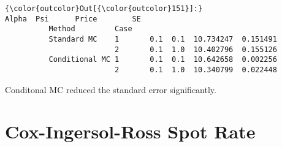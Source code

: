 \documentclass[11pt]{article}
\begin{document}
            \begin{Verbatim}[commandchars=\\\{\}]
{\color{outcolor}Out[{\color{outcolor}151}]:}                      Alpha  Psi      Price        SE
          Method         Case                                 
          Standard MC    1       0.1  0.1  10.734247  0.151491
                         2       0.1  1.0  10.402796  0.155126
          Conditional MC 1       0.1  0.1  10.642658  0.002256
                         2       0.1  1.0  10.340799  0.022448
\end{Verbatim}
        
    Conditonal MC reduced the standard error significantly.

    \section{Cox-Ingersol-Ross Spot Rate}\label{cox-ingersol-ross-spot-rate}
\end{document}
